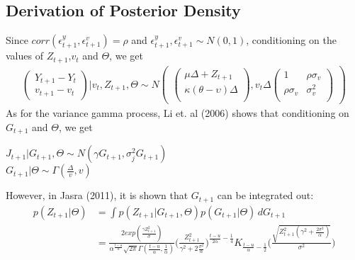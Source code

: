 \documentclass[11pt]{article}
\theoremstyle{definition}
\begin{document}
\subsection{Derivation of Posterior Density}
Since $corr(\epsilon_{t+1}^{y},\epsilon_{t+1}^{v})=\rho$ and $\epsilon_{t+1}^{y},\epsilon_{t+1}^{v} \sim N(0,1)$, conditioning on the values of $Z_{t+1}$,$v_{t}$ and $\Theta$, we get
\begin{equation}
	\begin{aligned}
\begin{pmatrix}
Y_{t+1} - Y_{t}\\
v_{t+1} - v_{t}
\end{pmatrix} | v_{t},Z_{t+1},\Theta
\sim
N
\begin{pmatrix}
\begin{pmatrix}
\mu \Delta + Z_{t+1} \\
\kappa (\theta - \upsilon) \Delta \\
\end{pmatrix}
,
v_{t} \Delta
\begin{pmatrix}
1 & \rho \sigma_{v} \\
\rho \sigma_{v} & \sigma_{v}^2 \\
\end{pmatrix}
\end{pmatrix}
	\end{aligned}
\end{equation}
As for the variance gamma process, Li et. al (2006) shows that conditioning on $G_{t+1}$ and $\Theta$, we get \\
\begin{center}
$J_{t+1} | G_{t+1},\Theta \sim N(\gamma G_{t+1},\sigma_{j}^{2}G_{t+1})$ \\
$G_{t+1} | \Theta \sim \Gamma(\frac{\Delta}{v},v)$\\
\end{center}
However, in Jasra (2011), it is shown that $G_{t+1}$ can be integrated out:
\begin{equation}
	\begin{aligned}
		p(Z_{t+1}|\Theta) &= \int p(Z_{t+1}|G_{t+1},\Theta)p(G_{t+1}|\Theta) \,dG_{t+1}\\
		&= \frac{2exp(\frac{\gamma Z_{t+1}^{2}}{\sigma})}{\alpha^{\frac{t-u}{\alpha}}\sqrt{2\pi} \Gamma(\frac{t-u}{\alpha},\frac{1}{\alpha})}\Bigg(\frac{Z_{t+1}^{2}}{\gamma^{2}+2\frac{\sigma^{2}}{\alpha}}\Bigg)^{\frac{t-u}{2\alpha}-\frac{1}{4}}K_{\frac{t-u}{\alpha}-\frac{1}{2}}\Bigg(\frac{\sqrt{Z_{t+1}^{2}(\gamma^{2}+\frac{2\sigma^{2}}{\alpha})}}{\sigma^{2}}\Bigg)
	\end{aligned}
\end{equation}
\end{document}
